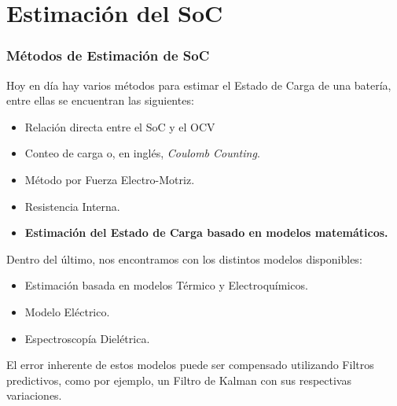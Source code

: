 \documentclass[10pt]{beamer}
\theoremstyle{remark}
\theoremstyle{definition}
\begin{document}
\section{Estimación del SoC}

\begin{frame}[allowframebreaks]
  \frametitle{Métodos de Estimación de SoC}

  Hoy en día hay varios métodos para estimar el Estado de Carga de una batería,
  entre ellas se encuentran las siguientes:
  \begin{itemize}
	\item Relación directa entre el SoC y el OCV
	\item Conteo de carga o, en inglés, \emph{Coulomb Counting}.
	\item Método por Fuerza Electro-Motriz.
	\item Resistencia Interna.
	\item \textbf{Estimación del Estado de Carga basado en modelos matemáticos.}
  \end{itemize}

  \framebreak

  Dentro del último, nos encontramos con los distintos modelos disponibles:

  \begin{itemize}
	\item Estimación basada en modelos Térmico y Electroquímicos.
	\item Modelo Eléctrico.
	\item Espectroscopía Dielétrica.
  \end{itemize}

  El error inherente de estos modelos puede ser compensado utilizando Filtros
  predictivos, como por ejemplo, un Filtro de Kalman con sus respectivas
  variaciones.

\end{frame}
\end{document}
